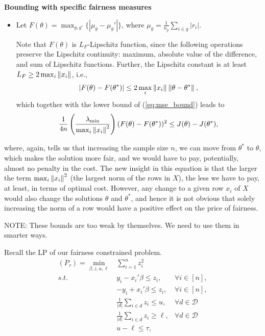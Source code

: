 \documentclass{article}
\newcommand{\D}{\mathcal{D}}
\begin{document}
\begin{enumerate}
        \textbf{Bounding with specific fairness measures}

        \begin{itemize}
            \item  Let $F(\theta)=\max_{g,g'}\{|\mu_g - \mu_g'|\}$, where $\mu_g = \frac{1}{n_g}\sum_{i\in g}|r_i|$.

            Note that $F(\theta)$ is $L_F$-Lipschitz function, since the following operations preserve the Lipschitz continuity: maximum, absolute value of the difference, and sum of Lipschitz functions. Further, the Lipschitz constant is at least $L_F\geq 2\max_{i}\norm[]{x_i}$, i.e.,
            \begin{equation*}
                |F(\theta) - F(\theta^*)| \leq 2\max_{i}\norm[]{x_i} \norm[]{\theta - \theta^*}, 
            \end{equation*}
            which together with the lower bound of (\ref{eq:mse_bound}) leads to 
            \begin{equation}
                \frac{1}{4n}\left(\frac{\lambda_{\min}}{\max_{i}\norm[]{x_i}^2}\right)(F(\theta) - F(\theta^*))^2 \leq  J(\theta) - J(\theta^*),
            \end{equation}
        \end{itemize}
where, again, tells us that increasing the sample size $n$, we can move from $\theta^*$ to $\theta$, which makes the solution more fair, and we would have to pay, potentially, almost no penalty in the cost. The new insight in this equation is that the larger the term $\max_{i}\norm[]{x_i}^2$ (the largest norm of the rows in $X$), the less we have to pay, at least, in terms of optimal cost. However, any change to a given row $x_i$ of $X$ would also change the solutions $\theta$ and $\theta^*$, and hence it is not obvious that solely increasing the norm of a row would have a positive effect on the price of fairness.

\end{enumerate}

{\color{red} NOTE: These bounds are too weak by themselves. We need to use them in smarter ways.}


Recall the LP of our fairness constrained problem.
\[
\begin{array}{rcc}
\displaystyle
   (P_\tau)=\min_{\beta,z,u,\ell} &  \sum_{i=1}^nz_i^2 \quad \quad \quad\\
       s.t.  & y_i-x_i'\beta \leq z_i, & \forall i \in [n],\\ %
      & -y_i+x_i'\beta \leq z_i, & \forall i \in [n],\\%
     & \frac{1}{|d|}\sum_{i\in d}z_i \leq u, & \forall d \in \D\\
& \frac{1}{|d|}\sum_{i\in d}z_i \geq \ell, & \forall d \in \D\\
      & u - \ell\leq \tau, &
\end{array}
\]
\end{document}
